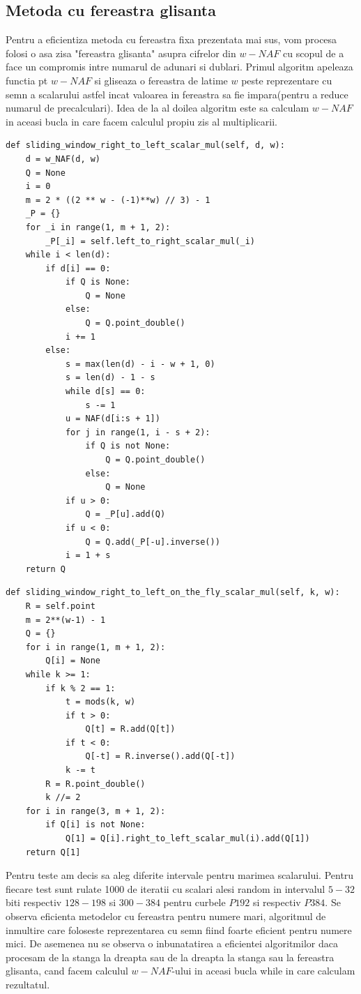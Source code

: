 \subsection{Metoda cu fereastra glisanta}
Pentru a eficientiza metoda cu fereastra fixa prezentata mai sus, vom procesa folosi o asa zisa "fereastra glisanta" asupra cifrelor din $w-NAF$ cu scopul de a face un compromis intre numarul de adunari si dublari. Primul algoritm apeleaza functia pt $w-NAF$ si gliseaza o fereastra de latime $w$ peste reprezentare cu semn a scalarului astfel incat valoarea in fereastra sa fie impara(pentru a reduce numarul de precalculari). Idea de la al doilea algoritm este sa calculam $w-NAF$ in aceasi bucla in care facem calculul propiu zis al multiplicarii.

\begin{lstlisting}
def sliding_window_right_to_left_scalar_mul(self, d, w):
    d = w_NAF(d, w)
    Q = None
    i = 0
    m = 2 * ((2 ** w - (-1)**w) // 3) - 1
    _P = {}
    for _i in range(1, m + 1, 2):
        _P[_i] = self.left_to_right_scalar_mul(_i)
    while i < len(d):
        if d[i] == 0:
            if Q is None:
                Q = None
            else:
                Q = Q.point_double()
            i += 1
        else:
            s = max(len(d) - i - w + 1, 0)
            s = len(d) - 1 - s
            while d[s] == 0:
                s -= 1
            u = NAF(d[i:s + 1])
            for j in range(1, i - s + 2):
                if Q is not None:
                    Q = Q.point_double()
                else:
                    Q = None
            if u > 0:
                Q = _P[u].add(Q)
            if u < 0:
                Q = Q.add(_P[-u].inverse())
            i = 1 + s
    return Q
\end{lstlisting}

\begin{lstlisting}
def sliding_window_right_to_left_on_the_fly_scalar_mul(self, k, w):
    R = self.point
    m = 2**(w-1) - 1
    Q = {}
    for i in range(1, m + 1, 2):
        Q[i] = None
    while k >= 1:
        if k % 2 == 1:
            t = mods(k, w)
            if t > 0:
                Q[t] = R.add(Q[t])
            if t < 0:
                Q[-t] = R.inverse().add(Q[-t])
            k -= t
        R = R.point_double()
        k //= 2
    for i in range(3, m + 1, 2):
        if Q[i] is not None:
            Q[1] = Q[i].right_to_left_scalar_mul(i).add(Q[1])
    return Q[1]
\end{lstlisting}

Pentru teste am decis sa aleg diferite intervale pentru marimea scalarului. Pentru fiecare test sunt rulate 1000 de iteratii cu scalari alesi random in intervalul $5-32$ biti respectiv $128-198$ si $300-384$ pentru curbele $P192$ si respectiv $P384$. Se observa eficienta metodelor cu fereastra pentru numere mari, algoritmul de inmultire care foloseste reprezentarea cu semn fiind foarte eficient pentru numere mici. De asemenea nu se observa o inbunatatirea a eficientei algoritmilor daca procesam de la stanga la dreapta sau de la dreapta la stanga sau la fereastra glisanta, cand facem calculul $w-NAF$-ului in aceasi bucla while in care calculam rezultatul.

